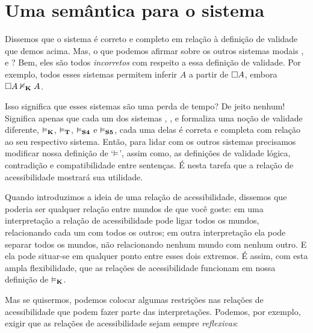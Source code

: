 
\section{Uma semântica para o sistema \mlT}
\label{SemanticsT}

Dissemos que o sistema \mlK{} é correto e completo em relação à definição de validade que demos acima. Mas,  o que podemos afirmar sobre os outros sistemas modais \mlT, \mlSfour{}  e \mlSfive  ? Bem, eles são todos  \emph{incorretos} com respeito a essa definição de validade. Por exemplo, todos esses sistemas permitem inferir $A$ a partir de $\Box A$, embora  $\Box A\nvDash_{\mathbf{K}} A$.

Isso significa que esses sistemas são uma perda de tempo? De jeito nenhum! Significa apenas que cada um dos sistemas \mlK{}, \mlT, \mlSfour{}  e \mlSfive{} formaliza uma noção de validade diferente, $\vDash_{\mathbf{K}}$, $\vDash_{\mathbf{T}}$, $\vDash_{\mathbf{S4}}$ e $\vDash_{\mathbf{S5}}$, cada uma delas é correta e completa com relação ao seu respectivo sistema. Então, para lidar com os outros sistemas precisamos modificar nossa definição de `$\vDash$', assim como, as definições de validade lógica, contradição e compatibilidade entre sentenças.  
É nesta tarefa que a  relação de acessibilidade mostrará sua utilidade.  

Quando introduzimos a ideia de uma relação de acessibilidade, dissemos que poderia ser qualquer relação entre mundos de que você goste:  em uma interpretação a relação de acessibilidade pode ligar todos os mundos, relacionando cada um com todos os outros; em outra interpretação ela pode separar todos os mundos, não relacionando nenhum mundo com nenhum outro. E ela pode situar-se em qualquer ponto entre esses dois extremos. É assim, com esta ampla flexibilidade, que as relações de acessibilidade funcionam em nossa definição de $\vDash_{\mathbf{K}}$. 

Mas se quisermos, podemos colocar algumas restrições nas relações de acessibilidade que podem fazer parte das interpretações. Podemos, por exemplo, exigir que as relações de acessibilidade sejam sempre \emph{reflexivas}:

